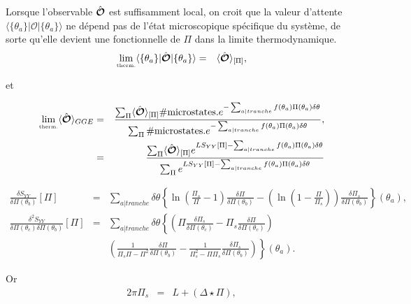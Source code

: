 	Lorsque l'observable $\hat{\bm{\mathcal{O}}}$ est suffisamment local, on croit que la valeur d'attente $\langle  \{ \theta_a\}  \vert   \mathcal{O} \vert \{ \theta_a\} \rangle$ ne dépend pas de l'état microscopique spécifique du système, de sorte qu'elle devient une fonctionnelle de $\Pi$ dans la limite thermodynamique.
	\begin{eqnarray}
		\underset{\mbox{\tiny therm.}}{\lim} \langle  \{ \theta_a\}  \vert   \hat{\bm{\mathcal{O}}} \vert \{ \theta_a\} \rangle & = & \langle \hat{\bm{\mathcal{O}}}\rangle_{[\Pi]},
	\end{eqnarray}
	
	et 
	
	\begin{eqnarray}
		\underset{\mbox{\tiny therm.}}{\lim} \langle \hat{\bm{\mathcal{O}}} \rangle_{GGE} & =  & \frac{ \sum_{\Pi}  \langle \hat{\bm{\mathcal{O}}}\rangle_{[\Pi]} \# \mbox{microstates.} e^{- \sum_{a \vert tranche} f(\theta_a) \Pi ( \theta_a )  \delta \theta}    }{\sum_{\Pi} \# \mbox{microstates.}  e^{- \sum_{a \vert tranche }  f(\theta_a) \Pi ( \theta_a ) \delta \theta } },\\
		& = & \frac{ \sum_{\Pi}  \langle \hat{\bm{\mathcal{O}}}\rangle_{[\Pi]}  e^{ L S_{YY}[\Pi]- \sum_{a \vert tranche} f(\theta_a) \Pi ( \theta_a )  \delta \theta}    }{\sum_{\Pi}  e^{ L S_{YY}[\Pi] - \sum_{a \vert tranche }  f(\theta_a) \Pi ( \theta_a ) \delta \theta } }
	\end{eqnarray}
	
	\begin{eqnarray}
			\frac{ \delta S_{YY} }{ \delta \Pi(\theta_b)  } [\Pi ]  & = & \sum_{a\vert tranche}   \delta \theta \left \{ \ln \left ( \frac{ \Pi_s}{ \Pi  } - 1 \right )\frac{\delta \Pi  }{ \delta \Pi(\theta_b)} -  \left ( \ln \left ( 1 - \frac{ \Pi}{ \Pi_s }\right ) \right )\frac{\delta \Pi_s  }{ \delta \Pi(\theta_b) } \right \} (\theta_a) ,\\
			\frac{ \delta^2 S_{YY} }{ \delta \Pi(\theta_c) \delta \Pi(\theta_b)  } [\Pi ]  & = & 	\sum_{a \vert tranche}   \delta \theta \left \{ \left ( \Pi  \frac{\delta \Pi_s  }{\delta \Pi ( \theta_c) }- \Pi_s  \frac{\delta \Pi  }{\delta \Pi ( \theta_c ) } \right ) \right.   \\
			&&   \left. \left ( \frac{1}{\Pi_s\Pi  -\Pi^2  }\frac{\delta \Pi }{\delta \Pi(\theta_b) }- \frac{1}{\Pi_s^2  - \Pi \Pi_s }\frac{\delta \Pi_s }{\delta \Pi(\theta_b) } \right )  \right \}(\theta_a).
		\end{eqnarray}
		
	Or 
	\begin{eqnarray}
		2\pi \Pi_s  & = &  L + ( \Delta \star \Pi ), 		
	\end{eqnarray}
	
